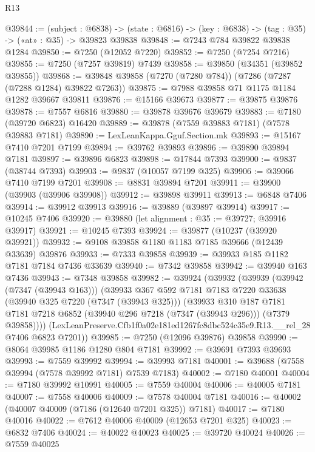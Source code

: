 \begin{lexlean}{R13}
\begin{coremodule}
@39844 := (subject : @6838) ->
  (state : @6816) -> (key : @6838) -> (tag : @35) -> («at» : @35) -> @39823 @39838
@39848 := @7243 @784 @39822 @39838 @1284
@39850 := @7250 (@12052 @7220)
@39852 := @7250 (@7254 @7216)
@39855 := @7250 (@7257 @39819) @7439
@39858 := @39850 (@34351 (@39852 @39855))
@39868 := @39848 @39858 (@7270 (@7280 @784)) (@7286 (@7287 (@7288 @1284) @39822 @7263))
@39875 := @7988 @39858 @71 @1175 @1184 @1282 @39667 @39811
@39876 := @15166 @39673
@39877 := @39875 @39876
@39878 := @7557 @6816
@39880 := @39878 @39676 @39679
@39883 := @7180 (@39720 @6823) @16420
@39889 := @39878 (@7559 @39883 @7181) (@7578 @39883 @7181)
@39890 := LexLeanKappa.Gguf.Section.mk
@39893 := @15167 @7410 @7201 @7199
@39894 := @39762 @39893
@39896 := @39890 @39894 @7181
@39897 := @39896 @6823
@39898 := @17844 @7393
@39900 := @9837 (@38744 @7393)
@39903 := @9837 (@10057 @7199 @325)
@39906 := @39066 @7410 @7199 @7201
@39908 := @8831 @39894 @7201
@39911 := @39900 (@39903 (@39906 @39908))
@39912 := @39898 @39911
@39913 := @6848 @7406
@39914 := @39912 @39913
@39916 := @39889 (@39897 @39914)
@39917 := @10245 @7406
@39920 := @39880 (let alignment : @35 := @39727; @39916 @39917)
@39921 := @10245 @7393
@39924 := @39877 (@10237 (@39920 @39921))
@39932 := @9108 @39858 @1180 @1183 @7185 @39666 (@12439 @33639) @39876
@39933 := @7333 @39858
@39939 := @39933 @185 @1182 @7181 @7184 @7436 @33639
@39940 := @7342 @39858
@39942 := @39940 @163 @7436
@39943 := @7348 @39858
@39982 := @39924
    (@39932
      (@39939
        (@39942 (@7347 (@39943 @163)))
        (@39933
          @367
          @592
          @7181
          @7183
          @7220
          @33638
          (@39940 @325 @7220 (@7347 (@39943 @325)))
          (@39933
            @310
            @187
            @7181
            @7181
            @7218
            @6852
            (@39940 @296 @7218 (@7347 (@39943 @296)))
            (@7379 @39858))))
      (LexLeanPreserve.Cfb1f0a02e181ed1267fc8dbc524c35e9.R13.__rel_28 @7406 @6823 @7201))
@39985 := @7250 (@12096 @39876) @39858
@39990 := @8064 @39985 @1186 @1280 @804 @7181
@39992 := @39691 @7393 @39693
@39993 := @7559 @39992
@39994 := @39993 @7181
@40001 := @39688 (@7558 @39994 (@7578 @39992 @7181) @7539 @7183)
@40002 := @7180 @40001
@40004 := @7180 @39992 @10991
@40005 := @7559 @40004
@40006 := @40005 @7181
@40007 := @7558 @40006
@40009 := @7578 @40004 @7181
@40016 := @40002 (@40007 @40009 (@7186 (@12640 @7201 @325)) @7181)
@40017 := @7180 @40016
@40022 := @7612 @40006 @40009 (@12653 @7201 @325)
@40023 := @6832 @7406
@40024 := @40022 @40023
@40025 := @39720 @40024
@40026 := @7559 @40025

\end{coremodule}
\end{lexlean}
